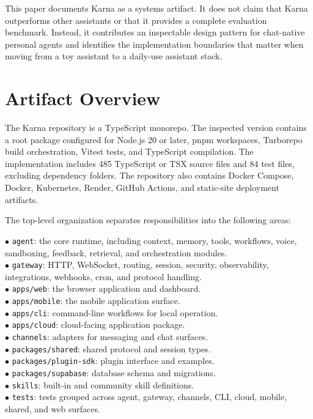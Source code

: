 \documentclass[11pt]{article}
\begin{document}
This paper documents Karna as a systems artifact. It does not claim that Karna outperforms other assistants or that it provides a complete evaluation benchmark. Instead, it contributes an inspectable design pattern for chat-native personal agents and identifies the implementation boundaries that matter when moving from a toy assistant to a daily-use assistant stack.

\section{Artifact Overview}

The Karna repository is a TypeScript monorepo. The inspected version contains a root package configured for Node.js 20 or later, pnpm workspaces, Turborepo build orchestration, Vitest tests, and TypeScript compilation. The implementation includes 485 TypeScript or TSX source files and 84 test files, excluding dependency folders. The repository also contains Docker Compose, Docker, Kubernetes, Render, GitHub Actions, and static-site deployment artifacts.

The top-level organization separates responsibilities into the following areas:

\noindent $\bullet$ \texttt{agent}: the core runtime, including context, memory, tools, workflows, voice, sandboxing, feedback, retrieval, and orchestration modules.\\
\noindent $\bullet$ \texttt{gateway}: HTTP, WebSocket, routing, session, security, observability, integrations, webhooks, cron, and protocol handling.\\
\noindent $\bullet$ \texttt{apps/web}: the browser application and dashboard.\\
\noindent $\bullet$ \texttt{apps/mobile}: the mobile application surface.\\
\noindent $\bullet$ \texttt{apps/cli}: command-line workflows for local operation.\\
\noindent $\bullet$ \texttt{apps/cloud}: cloud-facing application package.\\
\noindent $\bullet$ \texttt{channels}: adapters for messaging and chat surfaces.\\
\noindent $\bullet$ \texttt{packages/shared}: shared protocol and session types.\\
\noindent $\bullet$ \texttt{packages/plugin-sdk}: plugin interface and examples.\\
\noindent $\bullet$ \texttt{packages/supabase}: database schema and migrations.\\
\noindent $\bullet$ \texttt{skills}: built-in and community skill definitions.\\
\noindent $\bullet$ \texttt{tests}: tests grouped across agent, gateway, channels, CLI, cloud, mobile, shared, and web surfaces.\\
\end{document}
